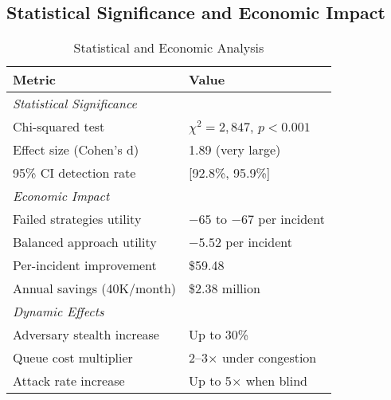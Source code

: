 \documentclass[10pt,conference]{IEEEtran}
\begin{document}
\subsection{Statistical Significance and Economic Impact}

\begin{table}[!h]
\centering
\caption{Statistical and Economic Analysis}
\footnotesize
\begin{tabular}{@{}ll@{}}
\toprule
\textbf{Metric} & \textbf{Value} \\
\midrule
\multicolumn{2}{l}{\textit{Statistical Significance}} \\
Chi-squared test & $\chi^2 = 2,847$, $p < 0.001$ \\
Effect size (Cohen's d) & 1.89 (very large) \\
95\% CI detection rate & [92.8\%, 95.9\%] \\
\midrule
\multicolumn{2}{l}{\textit{Economic Impact}} \\
Failed strategies utility & $-65$ to $-67$ per incident \\
Balanced approach utility & $-5.52$ per incident \\
\rowcolor{ieeegreen!10}
Per-incident improvement & \$59.48 \\
\rowcolor{ieeegreen!10}
Annual savings (40K/month) & \$2.38 million \\
\midrule
\multicolumn{2}{l}{\textit{Dynamic Effects}} \\
Adversary stealth increase & Up to 30\% \\
Queue cost multiplier & 2--3$\times$ under congestion \\
Attack rate increase & Up to 5$\times$ when blind \\
\bottomrule
\end{tabular}
\end{table}
\end{document}

